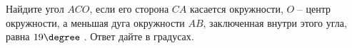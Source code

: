 \begin{ex}
	\begin{condition}
		Найдите угол \( ACO \), если его сторона \( CA \) касается окружности, \( O \) – центр окружности, а меньшая дуга окружности \( AB\),  заключенная внутри этого угла, равна \( 19\degree \) . Ответ дайте в градусах.
	\end{condition}
\end{ex}